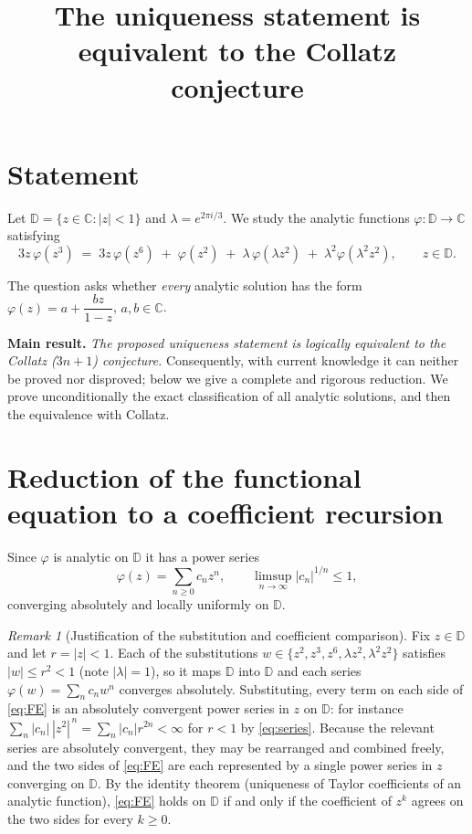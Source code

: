 \documentclass{amsart}
\theoremstyle{remark}
\newtheorem{remark}{Remark}
\begin{document}
\title{The uniqueness statement is equivalent to the Collatz conjecture}
\maketitle

\section*{Statement}
Let $\mathbb{D} = \{z \in \mathbb{C} : |z| < 1\}$ and $\lambda = e^{2\pi i/3}$.
We study the analytic functions $\varphi:\mathbb{D}\to\mathbb{C}$ satisfying
\begin{equation}\label{eq:FE}
3z\,\varphi(z^3) \;=\; 3z\,\varphi(z^6) \;+\; \varphi(z^2) \;+\; \lambda\,\varphi(\lambda z^2) \;+\; \lambda^2 \varphi(\lambda^2 z^2),
\qquad z\in\mathbb{D}.
\end{equation}

The question asks whether \emph{every} analytic solution has the form
$\varphi(z)=a+\dfrac{bz}{1-z}$, $a,b\in\mathbb{C}$.

\medskip
\noindent\textbf{Main result.} \emph{The proposed uniqueness statement is logically equivalent to the
Collatz ($3n+1$) conjecture.} Consequently, with current knowledge it can neither be proved nor
disproved; below we give a complete and rigorous reduction. We prove unconditionally the exact
classification of all analytic solutions, and then the equivalence with Collatz.

\section{Reduction of the functional equation to a coefficient recursion}

Since $\varphi$ is analytic on $\mathbb{D}$ it has a power series
\begin{equation}\label{eq:series}
\varphi(z)=\sum_{n\ge 0}c_n z^n,\qquad \limsup_{n\to\infty}|c_n|^{1/n}\le 1,
\end{equation}
converging absolutely and locally uniformly on $\mathbb{D}$.

\begin{remark}[Justification of the substitution and coefficient comparison]\label{rem:subst}
Fix $z\in\mathbb{D}$ and let $r=|z|<1$. Each of the substitutions
$w\in\{z^2,z^3,z^6,\lambda z^2,\lambda^2 z^2\}$ satisfies $|w|\le r^2<1$ (note $|\lambda|=1$), so it
maps $\mathbb{D}$ into $\mathbb{D}$ and each series $\varphi(w)=\sum_n c_n w^n$ converges absolutely.
Substituting, every term on each side of \eqref{eq:FE} is an absolutely convergent power series in
$z$ on $\mathbb{D}$: for instance $\sum_n|c_n|\,|z^2|^{\,n}=\sum_n|c_n|r^{2n}<\infty$ for $r<1$ by
\eqref{eq:series}. Because the relevant series are absolutely convergent, they may be rearranged and
combined freely, and the two sides of \eqref{eq:FE} are each represented by a single power series in
$z$ converging on $\mathbb{D}$. By the identity theorem (uniqueness of Taylor coefficients of an
analytic function), \eqref{eq:FE} holds on $\mathbb{D}$ if and only if the coefficient of $z^k$
agrees on the two sides for every $k\ge 0$.
\end{remark}
\end{document}
